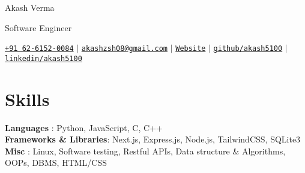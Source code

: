 \documentclass[letterpaper,11pt]{article}
\begin{document}
\setlength{\footskip}{4.08003pt}
\begin{center}
    {\Huge Akash Verma} \\ \vspace{4pt}
    \centerline{Software Engineer} \vspace{5pt}
    \small \texttt{\href{https://wa.me/+916261520084}{+91 62-6152-0084}} \hspace{1pt} $|$
    \hspace{1pt} \hspace{2pt} \texttt{\href{mailto:akashzsh08@gmail.com}{akashzsh08@gmail.com}} \hspace{1pt} $|$ 
    \hspace{1pt} \hspace{2pt} \texttt{\href{https://akashverma.vercel.app}{Website}} \hspace{1pt} $|$
    \hspace{1pt} \hspace{2pt}\texttt{\href{https://github.com/akash5100}{github/akash5100}} \hspace{1pt} $|$
    \hspace{1pt} \hspace{2pt}\texttt{\href{https://www.linkedin.com/in/akash5100/}{linkedin/akash5100}} \hspace{1pt}
    \\ \vspace{-5pt}
\end{center}



\vspace{-17pt}


\section{Skills}
 \begin{itemize}[leftmargin=0in, label={}]
    \small{\item{
     \textbf{Languages}              {: Python, JavaScript, C, C++} \vspace{2pt} \\
     \textbf{Frameworks \& Libraries}{: Next.js, Express.js, Node.js, TailwindCSS, SQLite3} \vspace{2pt} \\
     \textbf{Misc}                   {: Linux, Software testing, Restful APIs, Data structure \& Algorithms, OOPs, DBMS, HTML/CSS} \vspace{2pt} \\
    }}
 \end{itemize}
\end{document}
